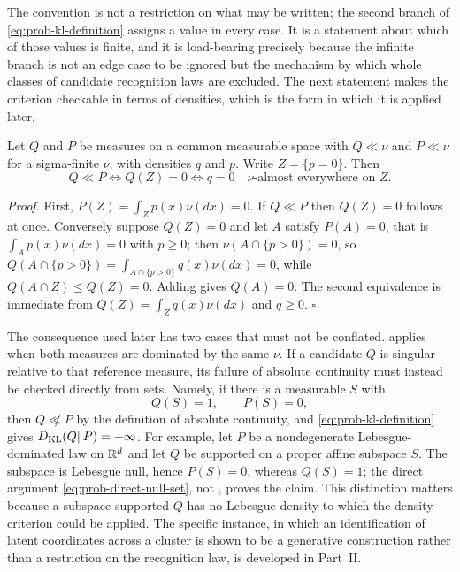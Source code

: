 The convention is not a restriction on what may be written; the second branch of \eqref{eq:prob-kl-definition} assigns a value in every case. It is a statement about which of those values is finite, and it is load-bearing precisely because the infinite branch is not an edge case to be ignored but the mechanism by which whole classes of candidate recognition laws are excluded. The next statement makes the criterion checkable in terms of densities, which is the form in which it is applied later.

\medskip
{}
Let $Q$ and $P$ be measures on a common measurable space with $Q\ll\nu$ and $P\ll\nu$ for a sigma-finite $\nu$, with densities $q$ and $p$. Write $Z=\{p=0\}$. Then
\begin{equation}
Q\ll P
\iff
Q(Z)=0
\iff
q=0\quad\nu\text{-almost everywhere on }Z .
\label{eq:prob-abscont-criterion}
\end{equation}
\medskip

\noindent\emph{Proof.} First, $P(Z)=\int_Z p(x)\nu(dx)=0$. If $Q\ll P$ then $Q(Z)=0$ follows at once. Conversely suppose $Q(Z)=0$ and let $A$ satisfy $P(A)=0$, that is $\int_A p(x)\nu(dx)=0$ with $p\geq0$; then $\nu(A\cap\{p>0\})=0$, so $Q(A\cap\{p>0\})=\int_{A\cap\{p>0\}}q(x)\nu(dx)=0$, while $Q(A\cap Z)\leq Q(Z)=0$. Adding gives $Q(A)=0$. The second equivalence is immediate from $Q(Z)=\int_Z q(x)\nu(dx)$ and $q\geq0$. \hfill$\square$

The consequence used later has two cases that must not be conflated.  applies when both measures are dominated by the same $\nu$. If a candidate $Q$ is singular relative to that reference measure, its failure of absolute continuity must instead be checked directly from sets. Namely, if there is a measurable $S$ with
\begin{equation}
Q(S)=1,
\qquad
P(S)=0,
\label{eq:prob-direct-null-set}
\end{equation}
then $Q\not\ll P$ by the definition of absolute continuity, and \eqref{eq:prob-kl-definition} gives $D_{\mathrm{KL}}(Q\Vert P)=+\infty$. For example, let $P$ be a nondegenerate Lebesgue-dominated law on $\mathbb R^d$ and let $Q$ be supported on a proper affine subspace $S$. The subspace is Lebesgue null, hence $P(S)=0$, whereas $Q(S)=1$; the direct argument \eqref{eq:prob-direct-null-set}, not , proves the claim. This distinction matters because a subspace-supported $Q$ has no Lebesgue density to which the density criterion could be applied. The specific instance, in which an identification of latent coordinates across a cluster is shown to be a generative construction rather than a restriction on the recognition law, is developed in Part~II.

